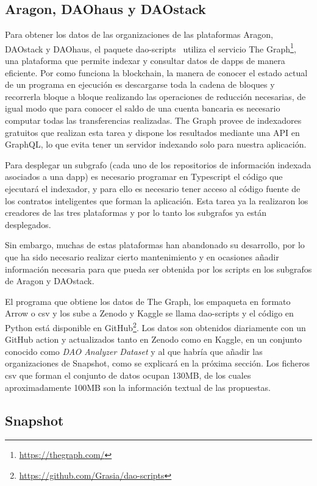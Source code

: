 \subsection{Aragon, DAOhaus y DAOstack}

Para obtener los datos de las organizaciones de las plataformas Aragon, DAOstack y DAOhaus, el paquete dao-scripts~\cite{arroyo_dao-analyzer_2022} utiliza el servicio The Graph\footnote{\url{https://thegraph.com/}}, una plataforma que permite indexar y consultar datos de \glspl{dapp} de manera eficiente. Por como funciona la blockchain, la manera de conocer el estado actual de un programa en ejecución es descargarse toda la cadena de bloques y recorrerla bloque a bloque realizando las operaciones de reducción necesarias, de igual modo que para conocer el saldo de una cuenta bancaria es necesario computar todas las transferencias realizadas. The Graph provee de indexadores gratuitos que realizan esta tarea y dispone los resultados mediante una API en GraphQL, lo que evita tener un servidor indexando solo para nuestra aplicación. 

Para desplegar un subgrafo (cada uno de los repositorios de información indexada asociados a una \gls{dapp}) es necesario programar en Typescript el código que ejecutará el indexador, y para ello es necesario tener acceso al código fuente de los contratos inteligentes que forman la aplicación. Esta tarea ya la realizaron los creadores de las tres plataformas y por lo tanto los subgrafos ya están desplegados.

Sin embargo, muchas de estas plataformas han abandonado su desarrollo, por lo que ha sido necesario realizar cierto mantenimiento y en ocasiones añadir información necesaria para que pueda ser obtenida por los scripts en los subgrafos de Aragon y DAOstack.

El programa que obtiene los datos de The Graph, los empaqueta en formato Arrow o \gls{csv} y los sube a Zenodo y Kaggle se llama dao-scripts y el código en Python está disponible en GitHub\footnote{\url{https://github.com/Grasia/dao-scripts}}. Los datos son obtenidos diariamente con un GitHub action y actualizados tanto en Zenodo como en Kaggle, en un conjunto conocido como \textit{DAO Analyzer Dataset} y al que habría que añadir las organizaciones de Snapshot, como se explicará en la próxima sección. Los ficheros \gls{csv} que forman el conjunto de datos ocupan 130MB, de los cuales aproximadamente 100MB son la información textual de las propuestas.

\subsection{Snapshot}

